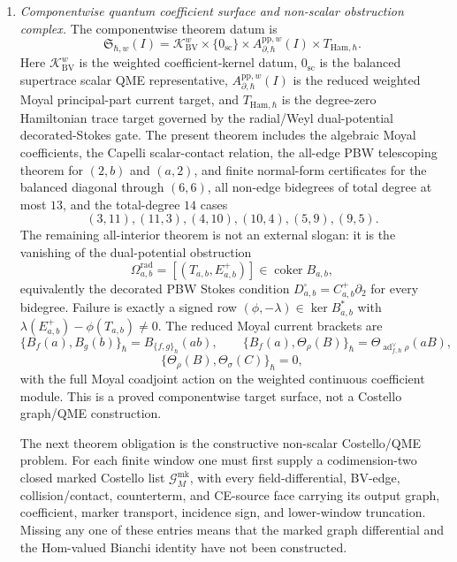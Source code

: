 \begin{enumerate}
  \item \emph{Componentwise quantum coefficient surface and non-scalar
  obstruction complex.}
  The componentwise theorem datum is
  \[
    \mathfrak S_{\hbar,w}(I)
      =
      \mathcal K_{\mathrm{BV}}^w
      \times\{0_{\mathrm{sc}}\}
      \times A^{\mathrm{pp},w}_{\partial,\hbar}(I)
      \times T_{\mathrm{Ham},\hbar}.
  \]
  Here \(\mathcal K_{\mathrm{BV}}^w\) is the weighted
  coefficient-kernel datum, \(0_{\mathrm{sc}}\) is the balanced
  supertrace scalar QME representative, \(A^{\mathrm{pp},w}_{\partial,\hbar}(I)\)
  is the reduced weighted Moyal principal-part current target, and
  \(T_{\mathrm{Ham},\hbar}\) is the degree-zero Hamiltonian trace target
  governed by the radial/Weyl dual-potential decorated-Stokes gate.  The
  present theorem
  includes the algebraic Moyal coefficients, the Capelli scalar-contact
  relation, the all-edge PBW telescoping theorem for
  \((2,b)\) and \((a,2)\), and finite normal-form certificates for the
  balanced diagonal through \((6,6)\), all non-edge bidegrees of total
  degree at most \(13\), and the total-degree \(14\) cases
  \[
    (3,11),(11,3),(4,10),(10,4),(5,9),(9,5).
  \]
  The remaining all-interior theorem is not an external slogan:
  it is the vanishing of the dual-potential obstruction
  \[
    \Omega^{\mathrm{rad}}_{a,b}
    =
    [(T_{a,b},E^+_{a,b})]\in\operatorname{coker}B_{a,b},
  \]
  equivalently the decorated PBW Stokes condition
  \(D^\square_{a,b}=C^+_{a,b}\partial_2\) for every bidegree.  Failure is
  exactly a signed row \((\phi,-\lambda)\in\ker B_{a,b}^*\) with
  \(\lambda(E^+_{a,b})-\phi(T_{a,b})\ne0\).
  The reduced Moyal current brackets are
  \[
    \{B_f(a),B_g(b)\}_\hbar
      =B_{\{f,g\}_\hbar}(ab),\qquad
    \{B_f(a),\Theta_\rho(B)\}_\hbar
      =
      \Theta_{\operatorname{ad}^{\vee}_{f,\hbar}\rho}(aB),
  \]
  \[
    \{\Theta_\rho(B),\Theta_\sigma(C)\}_\hbar=0,
  \]
  with the full Moyal coadjoint action on the weighted continuous
  coefficient module.  This is a proved componentwise target surface,
  not a Costello graph/QME construction.

  The next theorem obligation is the constructive non-scalar
  Costello/QME problem.  For each finite window one must first supply a
  codimension-two closed marked Costello list
  \(\mathcal G_M^{\mathrm{mk}}\), with every field-differential, BV-edge,
  collision/contact, counterterm, and CE-source face carrying its output
  graph, coefficient, marker transport, incidence sign, and lower-window
  truncation.  Missing any one of these entries means that the marked
  graph differential and the Hom-valued Bianchi identity have not been
  constructed.


\end{enumerate}
